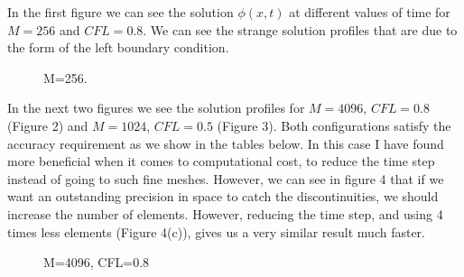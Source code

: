 In the first figure we can see the solution $\phi(x,t)$ at different values of time for $M=256$ and $CFL=0.8$. We can see the strange solution profiles that are due to the form of the left boundary condition.
\begin{figure}[H]
\centering     %
\hspace*{\fill}
\hfill
{}
\hspace*{\fill}

\hspace*{\fill}
\hfill
{}
\hspace*{\fill}

\hspace*{\fill}
\hfill
{}
\hspace*{\fill}
\caption{M=256.}
\end{figure}

In the next two figures we see the solution profiles for $M=4096$, $CFL=0.8$ (Figure 2) and $M=1024$, $CFL=0.5$ (Figure 3). Both configurations satisfy the accuracy requirement as we show in the tables below. In this case I have found more beneficial when it comes to computational cost, to reduce the time step instead of going to such fine meshes. However, we can see in figure 4 that if we want an outstanding precision in space to catch the discontinuities, we should increase the number of elements. However, reducing the time step, and using 4 times less elements (Figure 4(c)), gives us a very similar result much faster.
\begin{figure}[H]
\centering     %
\hspace*{\fill}
\hfill
{}
\hspace*{\fill}

\hspace*{\fill}
\hfill
{}
\hspace*{\fill}

\hspace*{\fill}
\hfill
{}
\hspace*{\fill}
\caption{M=4096, CFL=0.8}
\end{figure}

